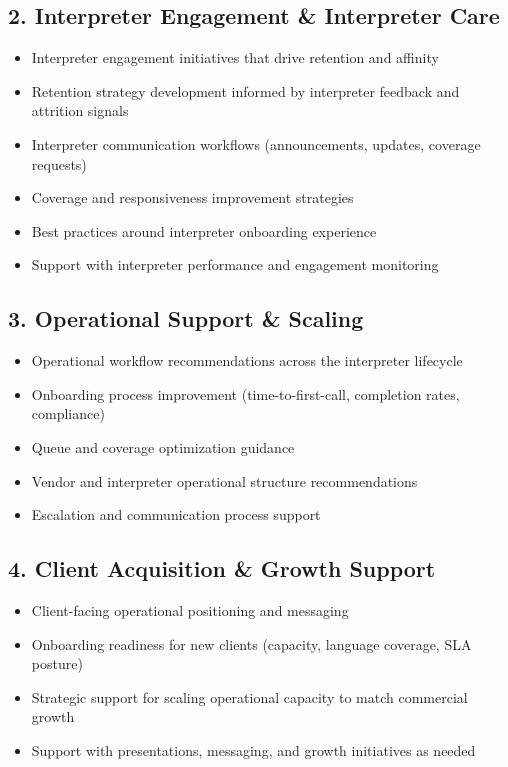 \documentclass{proposal}
\begin{document}
\subsection{2. Interpreter Engagement \& Interpreter Care}

\begin{itemize}[leftmargin=1.5em, itemsep=3pt, topsep=2pt]
  \item Interpreter engagement initiatives that drive retention and
        affinity
  \item Retention strategy development informed by interpreter feedback
        and attrition signals
  \item Interpreter communication workflows (announcements, updates,
        coverage requests)
  \item Coverage and responsiveness improvement strategies
  \item Best practices around interpreter onboarding experience
  \item Support with interpreter performance and engagement monitoring
\end{itemize}

\subsection{3. Operational Support \& Scaling}

\begin{itemize}[leftmargin=1.5em, itemsep=3pt, topsep=2pt]
  \item Operational workflow recommendations across the interpreter
        lifecycle
  \item Onboarding process improvement (time-to-first-call, completion
        rates, compliance)
  \item Queue and coverage optimization guidance
  \item Vendor and interpreter operational structure recommendations
  \item Escalation and communication process support
\end{itemize}

\subsection{4. Client Acquisition \& Growth Support}

\begin{itemize}[leftmargin=1.5em, itemsep=3pt, topsep=2pt]
  \item Client-facing operational positioning and messaging
  \item Onboarding readiness for new clients (capacity, language coverage,
        SLA posture)
  \item Strategic support for scaling operational capacity to match
        commercial growth
  \item Support with presentations, messaging, and growth initiatives as
        needed
\end{itemize}
\end{document}
